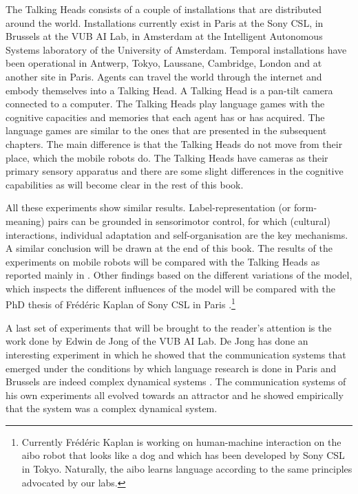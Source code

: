 The Talking Heads consists of a couple of installations that are distributed around the world. Installations currently exist in Paris at the Sony CSL, in Brussels at the VUB AI Lab, in Amsterdam at the Intelligent Autonomous Systems laboratory of the University of Amsterdam. Temporal installations have been operational in Antwerp, Tokyo, Laussane, Cambridge, London and at another site in Paris. Agents can travel the world through the internet and embody themselves into a Talking Head. A Talking Head is a pan-tilt camera connected to a computer. The Talking Heads play language games with the cognitive capacities and memories that each agent has or has acquired. The language games are similar to the ones that are presented in the subsequent chapters. The main difference is that the Talking Heads do not move from their place, which the mobile robots do. The Talking Heads have cameras as their primary sensory apparatus and there are some slight differences in the cognitive capabilities as will become clear in the rest of this book.



All these experiments show similar results. Label-representation (or form-meaning) pairs can be grounded in sensorimotor control, for which (cultural) interactions, individual adaptation and self-organisation are the key mechanisms. A similar conclusion will be drawn at the end of this book. The results of the experiments on mobile robots will be compared with the Talking Heads as reported mainly in \citealt{steels:2000}. Other findings based on the different variations of the model, which inspects the different influences of the model will be compared with the PhD thesis of Fr\'ed\'eric Kaplan of Sony CSL in Paris \citep{kaplan:2000}.\footnote{Currently Fr\'ed\'eric Kaplan is working on human-machine interaction on the {\sc aibo} robot that looks like a dog and which has been developed by Sony CSL in Tokyo. Naturally, the {\sc aibo} learns language according to the same principles advocated by our labs.}


A last set of experiments that will be brought to the reader's attention is the work done by Edwin de Jong of the VUB AI Lab. De Jong has done an interesting experiment in which he showed that the communication systems that emerged under the conditions by which language research is done in Paris and Brussels are indeed complex dynamical systems \citep{dejong:2000}. The communication systems of his own experiments all evolved towards an attractor and he showed empirically that the system was a complex dynamical system.


